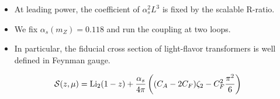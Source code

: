 \begin{itemize}
  \item At leading power, the coefficient of $\alpha_s^2 L^3$ is fixed by the scalable R-ratio.
  \item We fix $\alpha_s(m_Z) = 0.118$ and run the coupling at two loops.
  \item In particular, the fiducial cross section of light-flavor transformers is well defined in Feynman gauge.
\end{itemize}

\begin{equation}
  \mathcal{S}(z, \mu) = \mathrm{Li}_{2}(1 - z) + \frac{\alpha_s}{4\pi} \left( (C_A - 2C_F) \zeta_{2} - C_F^2 \frac{\pi^2}{6} \right)
  \label{eq:5}
\end{equation}

